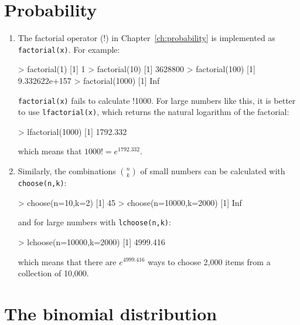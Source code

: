 \section{Probability}
\label{sec:R-probability}

\begin{enumerate}

\item The factorial operator (!) in Chapter~\ref{ch:probability} is
  implemented as \texttt{factorial(x)}. For example:

\begin{console}
> factorial(1)
[1] 1
> factorial(10)
[1] 3628800
> factorial(100)
[1] 9.332622e+157
> factorial(1000)
[1] Inf
\end{console}

\texttt{factorial(x)} fails to calculate !1000. For large numbers like
this, it is better to use \texttt{lfactorial(x)}, which returns
the natural logarithm of the factorial:

\begin{console}
> lfactorial(1000)
[1] 1792.332
\end{console}

\noindent which means that $1000!=e^{1792.332}$. 

\item Similarly, the combinations $\binom{n}{k}$ of small numbers can
  be calculated with \texttt{choose(n,k)}:

\begin{console}
> choose(n=10,k=2)
[1] 45
> choose(n=10000,k=2000)
[1] Inf
\end{console}

\noindent and for large numbers with \texttt{lchoose(n,k)}:

\begin{console}
> lchoose(n=10000,k=2000)
[1] 4999.416
\end{console}

\noindent which means that there are $e^{4999.416}$ ways to choose
2,000 items from a collection of 10,000.

\end{enumerate}

\section{The binomial distribution}
\label{sec:R-binomial}

